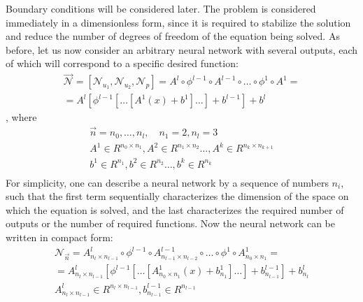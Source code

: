 Boundary conditions will be considered later. The problem is considered immediately in a dimensionless form, since it is required to stabilize the solution and reduce the number of degrees of freedom of the equation being solved. As before, let us now consider an arbitrary neural network with several outputs, each of which will correspond to a specific desired function:
\begin{equation}
	\label{eq:model_stokes_arb}
	\begin{multlined}
		\vec{\mathcal{N}} = [\mathcal{N}_{u_1}, \mathcal{N}_{u_2}, \mathcal{N}_p] = A^l \circ \phi^{l - 1} \circ A^{l - 1} \circ \dots \circ \phi^1 \circ A^1 = \\ = A^l \left [ \phi^{l - 1} \left [ \dots \left [ A^1 (x) + b^1 \right ] \dots \right ] + b^{l - 1} \right] + b^l
	\end{multlined}
\end{equation}
, where
\begin{equation}
	\begin{multlined}
		\vec{n} = {n_0, \dots, n_l}, \quad n_1 = 2, n_l = 3 \\
		A^{1} \in R^{n_0 \times n_1}, A^{2} \in R^{n_1 \times n_2} \dots, A^{k} \in R^{n_k \times n_{k + 1}} \\
		b^{1} \in R^{n_1}, b^{2} \in R^{n_2} \dots, b^{k} \in R^{n_k} \\
	\end{multlined}
\end{equation}
For simplicity, one can describe a neural network by a sequence of numbers $n_i$, such that the first term sequentially characterizes the dimension of the space on which the equation is solved, and the last characterizes the required number of outputs or the number of required functions. Now the neural network can be written in compact form:
\begin{equation}
	\begin{multlined}
		\mathcal{N}_{\vec{n}} = A^l_{n_{l} \times n_{l - 1}} \circ \phi^{l - 1} \circ A^{l - 1}_{n_{l - 1} \times n_{l - 2}} \circ \dots \circ \phi^1 \circ A^1_{n_{0} \times n_{1}} = \\ = A^l_{n_{l} \times n_{l - 1}} \left [ \phi^{l - 1} \left [ \dots \left [ A^1_{n_{0} \times n_{1}} (x) + b^1_{n_1} \right ] \dots \right ] + b^{l - 1}_{n_{l - 1}} \right] + b^l_{n_l} \\ A^l_{n_{l} \times n_{l - 1}} \in R^{n_{l} \times n_{l - 1}}, b^{l - 1}_{n_{l - 1}} \in R^{n_{l - 1}}
	\end{multlined}
\end{equation}


